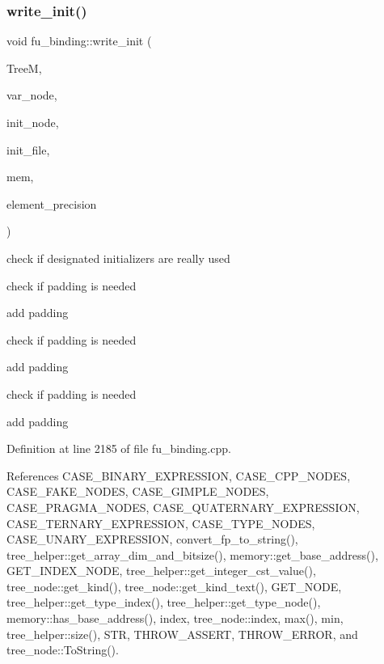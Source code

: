 \subsubsection{\texorpdfstring{write\+\_\+init()}{write\_init()}}
{\footnotesize\ttfamily void fu\+\_\+binding\+::write\+\_\+init (\begin{DoxyParamCaption}\item[{const \hyperlink{tree__manager_8hpp_a792e3f1f892d7d997a8d8a4a12e39346}{tree\+\_\+manager\+Const\+Ref}}]{TreeM,  }\item[{\hyperlink{tree__node_8hpp_a6ee377554d1c4871ad66a337eaa67fd5}{tree\+\_\+node\+Ref}}]{var\+\_\+node,  }\item[{\hyperlink{tree__node_8hpp_a6ee377554d1c4871ad66a337eaa67fd5}{tree\+\_\+node\+Ref}}]{init\+\_\+node,  }\item[{std\+::vector$<$ std\+::string $>$ \&}]{init\+\_\+file,  }\item[{const \hyperlink{memory_8hpp_aec1333ec6cd561731fb3ed3e55b9caf5}{memory\+Ref}}]{mem,  }\item[{unsigned int}]{element\+\_\+precision }\end{DoxyParamCaption})\hspace{0.3cm}{\ttfamily [static]}}

check if designated initializers are really used

check if padding is needed

add padding

check if padding is needed

add padding

check if padding is needed

add padding 

Definition at line 2185 of file fu\+\_\+binding.\+cpp.



References C\+A\+S\+E\+\_\+\+B\+I\+N\+A\+R\+Y\+\_\+\+E\+X\+P\+R\+E\+S\+S\+I\+ON, C\+A\+S\+E\+\_\+\+C\+P\+P\+\_\+\+N\+O\+D\+ES, C\+A\+S\+E\+\_\+\+F\+A\+K\+E\+\_\+\+N\+O\+D\+ES, C\+A\+S\+E\+\_\+\+G\+I\+M\+P\+L\+E\+\_\+\+N\+O\+D\+ES, C\+A\+S\+E\+\_\+\+P\+R\+A\+G\+M\+A\+\_\+\+N\+O\+D\+ES, C\+A\+S\+E\+\_\+\+Q\+U\+A\+T\+E\+R\+N\+A\+R\+Y\+\_\+\+E\+X\+P\+R\+E\+S\+S\+I\+ON, C\+A\+S\+E\+\_\+\+T\+E\+R\+N\+A\+R\+Y\+\_\+\+E\+X\+P\+R\+E\+S\+S\+I\+ON, C\+A\+S\+E\+\_\+\+T\+Y\+P\+E\+\_\+\+N\+O\+D\+ES, C\+A\+S\+E\+\_\+\+U\+N\+A\+R\+Y\+\_\+\+E\+X\+P\+R\+E\+S\+S\+I\+ON, convert\+\_\+fp\+\_\+to\+\_\+string(), tree\+\_\+helper\+::get\+\_\+array\+\_\+dim\+\_\+and\+\_\+bitsize(), memory\+::get\+\_\+base\+\_\+address(), G\+E\+T\+\_\+\+I\+N\+D\+E\+X\+\_\+\+N\+O\+DE, tree\+\_\+helper\+::get\+\_\+integer\+\_\+cst\+\_\+value(), tree\+\_\+node\+::get\+\_\+kind(), tree\+\_\+node\+::get\+\_\+kind\+\_\+text(), G\+E\+T\+\_\+\+N\+O\+DE, tree\+\_\+helper\+::get\+\_\+type\+\_\+index(), tree\+\_\+helper\+::get\+\_\+type\+\_\+node(), memory\+::has\+\_\+base\+\_\+address(), index, tree\+\_\+node\+::index, max(), min, tree\+\_\+helper\+::size(), S\+TR, T\+H\+R\+O\+W\+\_\+\+A\+S\+S\+E\+RT, T\+H\+R\+O\+W\+\_\+\+E\+R\+R\+OR, and tree\+\_\+node\+::\+To\+String().



